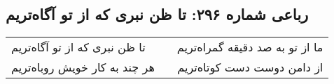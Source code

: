 \begin{center}
\section*{رباعی شماره ۲۹۶: تا ظن نبری که از تو آگاه‌تریم}
\label{sec:sh296}
\begin{longtable}{l p{0.5cm} r}
تا ظن نبری که از تو آگاه‌تریم
&&
ما از تو به صد دقیقه گمراه‌تریم
\\
هر چند به کار خویش روباه‌تریم
&&
از دامن دوست دست کوتاه‌تریم
\\
\end{longtable}
\end{center}
